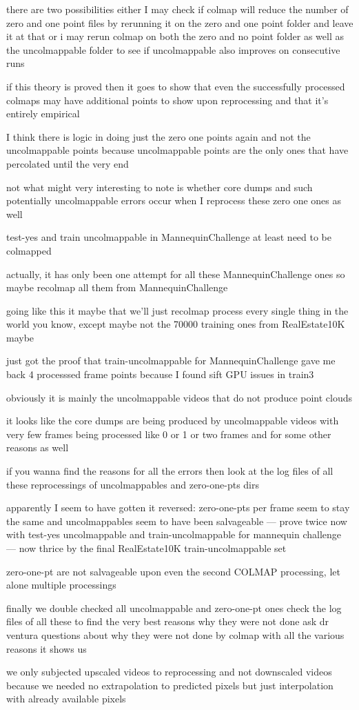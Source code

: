 there are two possibilities 
either I may check if colmap will reduce the number of zero and one point files by rerunning it on the zero and one point folder and leave it at that 
or i may rerun colmap on both the zero and no point folder as well as the uncolmappable folder to see if uncolmappable also improves on consecutive runs 

if this theory is proved then it goes to show that even the successfully processed colmaps may have additional points to show upon reprocessing and that it's entirely empirical

I think there is logic in doing just the zero one points again and not the uncolmappable points because uncolmappable points are the only ones that have percolated until the very end

not what might very interesting to note is whether core dumps and such potentially uncolmappable errors occur when I reprocess these zero one ones as well

test-yes and train uncolmappable in MannequinChallenge at least need to be colmapped

actually, it has only been one attempt for all these MannequinChallenge ones so maybe recolmap all them from MannequinChallenge

going like this it maybe that we'll just recolmap process every single thing in the world you know, except maybe not the 70000 training ones from RealEstate10K maybe

just got the proof that train-uncolmappable for MannequinChallenge gave me back 4 processsed frame points because I found sift GPU issues in train3

obviously it is mainly the uncolmappable videos that do not produce point clouds

it looks like the core dumps are being produced by uncolmappable videos with very few frames being processed
like 0 or 1 or two frames and for some other reasons as well

if you wanna find the reasons for all the errors then look at the log files of all these reprocessings of uncolmappables and zero-one-pts dirs 

apparently I seem to have gotten it reversed: zero-one-pts per frame seem to stay the same and uncolmappables seem to have been salvageable --- prove twice now with test-yes uncolmappable and train-uncolmappable for mannequin challenge --- now thrice by the final RealEstate10K train-uncolmappable set

zero-one-pt are not salvageable upon even the second COLMAP processing, let alone multiple processings

finally we double checked all uncolmappable and zero-one-pt ones
check the log files of all these to find the very best reasons why they were not done
ask dr ventura questions about why they were not done by colmap with all the various reasons it shows us

we only subjected upscaled videos to reprocessing and not downscaled videos because we needed no extrapolation to predicted pixels but just interpolation with already available pixels  